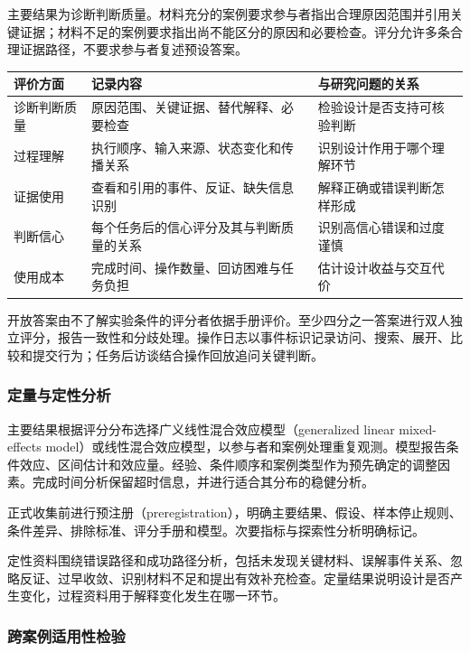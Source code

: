 主要结果为诊断判断质量。材料充分的案例要求参与者指出合理原因范围并引用关键证据；材料不足的案例要求指出尚不能区分的原因和必要检查。评分允许多条合理证据路径，不要求参与者复述预设答案。

\begin{table}[H]
  \centering
  \small
  \begin{tabularx}{\textwidth}{p{} p{} Y}
    \toprule
    评价方面 & 记录内容 & 与研究问题的关系 \\
    \midrule
    诊断判断质量 & 原因范围、关键证据、替代解释、必要检查 & 检验设计是否支持可核验判断 \\
    过程理解 & 执行顺序、输入来源、状态变化和传播关系 & 识别设计作用于哪个理解环节 \\
    证据使用 & 查看和引用的事件、反证、缺失信息识别 & 解释正确或错误判断怎样形成 \\
    判断信心 & 每个任务后的信心评分及其与判断质量的关系 & 识别高信心错误和过度谨慎 \\
    使用成本 & 完成时间、操作数量、回访困难与任务负担 & 估计设计收益与交互代价 \\
    \bottomrule
  \end{tabularx}
\end{table}

开放答案由不了解实验条件的评分者依据手册评价。至少四分之一答案进行双人独立评分，报告一致性和分歧处理。操作日志以事件标识记录访问、搜索、展开、比较和提交行为；任务后访谈结合操作回放追问关键判断。

\subsubsection{定量与定性分析}

主要结果根据评分分布选择广义线性混合效应模型（generalized linear mixed-effects model）或线性混合效应模型，以参与者和案例处理重复观测。模型报告条件效应、区间估计和效应量。经验、条件顺序和案例类型作为预先确定的调整因素。完成时间分析保留超时信息，并进行适合其分布的稳健分析。

正式收集前进行预注册（preregistration），明确主要结果、假设、样本停止规则、条件差异、排除标准、评分手册和模型。次要指标与探索性分析明确标记。

定性资料围绕错误路径和成功路径分析，包括未发现关键材料、误解事件关系、忽略反证、过早收敛、识别材料不足和提出有效补充检查。定量结果说明设计是否产生变化，过程资料用于解释变化发生在哪一环节。

\subsubsection{跨案例适用性检验}

